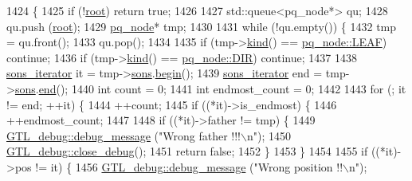 \begin{DoxyCode}
1424 \{    
1425     \textcolor{keywordflow}{if} (!\mbox{\hyperlink{classpq__tree_ad8e4e2235fe68fb99769cec54e1760ba}{root}}) \textcolor{keywordflow}{return} \textcolor{keyword}{true};
1426     
1427     std::queue<pq\_node*> qu;
1428     qu.push (\mbox{\hyperlink{classpq__tree_ad8e4e2235fe68fb99769cec54e1760ba}{root}});
1429     \mbox{\hyperlink{classpq__node}{pq\_node}}* tmp;
1430     
1431     \textcolor{keywordflow}{while} (!qu.empty()) \{
1432     tmp = qu.front();
1433     qu.pop();
1434     
1435     \textcolor{keywordflow}{if} (tmp->\mbox{\hyperlink{classpq__node_aa9873c0cfad88bc4404857ce57d422e4}{kind}}() == \mbox{\hyperlink{classpq__node_a96827bdca8bf81d20213405dd27f8fa6a80289f856abee0f9cb17852111ba9991}{pq\_node::LEAF}}) \textcolor{keywordflow}{continue};
1436     \textcolor{keywordflow}{if} (tmp->\mbox{\hyperlink{classpq__node_aa9873c0cfad88bc4404857ce57d422e4}{kind}}() == \mbox{\hyperlink{classpq__node_a96827bdca8bf81d20213405dd27f8fa6a5afa3e7100ee720a1569cfff090a210d}{pq\_node::DIR}}) \textcolor{keywordflow}{continue};
1437     
1438     \mbox{\hyperlink{classpq__tree_ab47263066d4b0acc70e00043870d748a}{sons\_iterator}} it = tmp->\mbox{\hyperlink{classpq__node_a2cc030cfa4560872acea8b50ebd0542b}{sons}}.\mbox{\hyperlink{classsymlist_a525b8d44af5d771fe15916372515cce0}{begin}}();
1439     \mbox{\hyperlink{classpq__tree_ab47263066d4b0acc70e00043870d748a}{sons\_iterator}} end = tmp->\mbox{\hyperlink{classpq__node_a2cc030cfa4560872acea8b50ebd0542b}{sons}}.\mbox{\hyperlink{classsymlist_a7283589fa01f79d722f8256d7a6a7883}{end}}();
1440     \textcolor{keywordtype}{int} count = 0;
1441     \textcolor{keywordtype}{int} endmost\_count = 0;
1442     
1443     \textcolor{keywordflow}{for} (; it != end; ++it) \{
1444         ++count;
1445         \textcolor{keywordflow}{if} ((*it)->is\_endmost) \{
1446         ++endmost\_count;
1447         
1448         \textcolor{keywordflow}{if} ((*it)->father != tmp) \{
1449             \mbox{\hyperlink{class_g_t_l__debug_aca4c2fb24203b5fba5e4ffa9c2fa263f}{GTL\_debug::debug\_message}} (\textcolor{stringliteral}{"Wrong father !!!\(\backslash\)n"});
1450             \mbox{\hyperlink{class_g_t_l__debug_a18b39d8b303a59062f86702a01ab6a98}{GTL\_debug::close\_debug}}();
1451             \textcolor{keywordflow}{return} \textcolor{keyword}{false};
1452         \}
1453         \}
1454         
1455         \textcolor{keywordflow}{if} ((*it)->pos != it) \{
1456         \mbox{\hyperlink{class_g_t_l__debug_aca4c2fb24203b5fba5e4ffa9c2fa263f}{GTL\_debug::debug\_message}} (\textcolor{stringliteral}{"Wrong position !!\(\backslash\)n"});

\end{DoxyCode}
